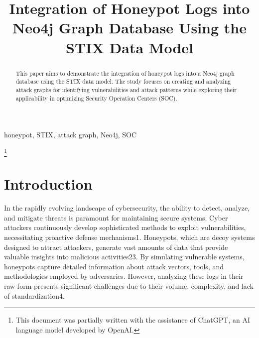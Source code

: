 \documentclass[conference]{IEEEtran}
\begin{document}
\title{Integration of Honeypot Logs into Neo4j Graph Database Using the STIX Data Model}

\author{
\and
{}
}

\maketitle

\begin{abstract}
This paper aims to demonstrate the integration of honeypot logs into a Neo4j graph database using the STIX data model. The study focuses on creating and analyzing attack graphs for identifying vulnerabilities and attack patterns while exploring their applicability in optimizing Security Operation Centers (SOC).
\end{abstract}

\begin{IEEEkeywords}
honeypot, STIX, attack graph, Neo4j, SOC
\end{IEEEkeywords}

\thanks{This document was partially written with the assistance of ChatGPT, an AI language model developed by OpenAI.\cite{openai2024chatgpt}}

\section{Introduction}

In the rapidly evolving landscape of cybersecurity, the ability to detect, analyze, and mitigate threats is paramount for maintaining secure systems. Cyber attackers continuously develop sophisticated methods to exploit vulnerabilities, necessitating proactive defense mechanisms1. Honeypots, which are decoy systems designed to attract attackers, generate vast amounts of data that provide valuable insights into malicious activities23. By simulating vulnerable systems, honeypots capture detailed information about attack vectors, tools, and methodologies employed by adversaries. However, analyzing these logs in their raw form presents significant challenges due to their volume, complexity, and lack of standardization4.
\end{document}
